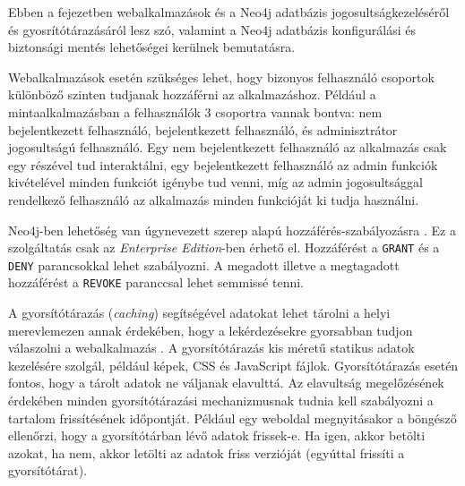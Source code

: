 
Ebben a fejezetben webalkalmazások és a Neo4j adatbázis jogosultságkezeléséről és gyosrítótárazásáról lesz szó, valamint a Neo4j adatbázis konfigurálási és biztonsági mentés lehetőségei kerülnek bemutatásra.



Webalkalmazások esetén szükséges lehet, hogy bizonyos felhasználó csoportok különböző szinten tudjanak hozzáférni az alkalmazáshoz. Például a mintaalkalmazásban a felhasználók 3 csoportra vannak bontva: nem bejelentkezett felhasználó, bejelentkezett  felhasználó, és adminisztrátor jogosultságú felhasználó. Egy nem bejelentkezett felhasználó az alkalmazás csak egy részével tud interaktálni, egy bejelentkezett felhasználó az admin funkciók kivételével minden funkciót igénybe tud venni, míg az admin jogosultsággal rendelkező felhasználó az alkalmazás minden funkcióját ki tudja használni.

Neo4j-ben lehetőség van úgynevezett szerep alapú hozzáférés-szabályozásra \cite{neo4j-privileges}. Ez a szolgáltatás csak az \textit{Enterprise Edition}-ben érhető el. Hozzáférést a \texttt{GRANT} és a \texttt{DENY} parancsokkal lehet szabályozni. A megadott illetve a megtagadott hozzáférést a \texttt{REVOKE} paranccsal lehet semmissé tenni. 


A gyorsítótárazás (\textit{caching}) segítségével adatokat lehet tárolni a helyi merevlemezen annak érdekében, hogy a lekérdezésekre gyorsabban tudjon válaszolni a webalkalmazás \cite{cache}. A gyorsítótárazás kis méretű statikus adatok kezelésére szolgál, például képek, CSS és JavaScript fájlok. Gyorsítótárazás esetén fontos, hogy a tárolt adatok ne váljanak elavulttá. Az elavultság megelőzésének érdekében minden gyorsítótárazási mechanizmusnak tudnia kell szabályozni a tartalom frissítésének időpontját. Például egy weboldal megnyitásakor a böngésző ellenőrzi, hogy a gyorsítótárban lévő adatok frissek-e. Ha igen, akkor betölti azokat, ha nem, akkor letölti az adatok friss verzióját (egyúttal frissíti a gyorsítótárat).

